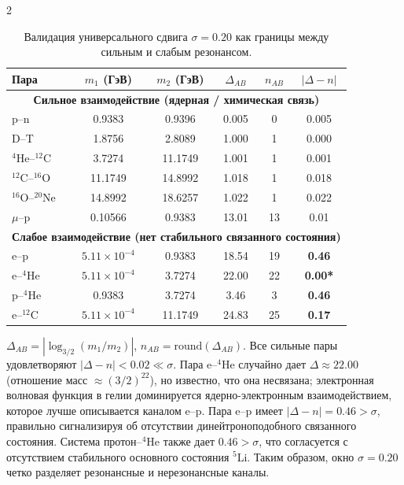 \documentclass[11pt,a4paper]{article}
\begin{document}
\begin{multicols}{2}
		\begin{table}[H]
			\centering
			\caption{Валидация универсального сдвига \(\sigma = 0.20\) как границы между сильным и слабым резонансом.}
			\label{tab:sigma_validation}
			\small
			\begin{tabular}{l c c c c c}
				\toprule
				Пара & $m_1$ (ГэВ) & $m_2$ (ГэВ) & $\Delta_{AB}$ & $n_{AB}$ & $|\Delta - n|$ \\
				\midrule
				\multicolumn{6}{c}{\textbf{Сильное взаимодействие (ядерная / химическая связь)}} \\
				p--n           & 0.9383 & 0.9396 & 0.005  & 0 & 0.005 \\
				D--T           & 1.8756 & 2.8089 & 1.000  & 1 & 0.000 \\
				$^4$He--$^{12}$C  & 3.7274 & 11.1749 & 1.001  & 1 & 0.001 \\
				$^{12}$C--$^{16}$O & 11.1749& 14.8992 & 1.018  & 1 & 0.018 \\
				$^{16}$O--$^{20}$Ne& 14.8992& 18.6257 & 1.022  & 1 & 0.022 \\
				$\mu$--p        & 0.10566& 0.9383 & 13.01  &13 & 0.01  \\
				\midrule
				\multicolumn{6}{c}{\textbf{Слабое взаимодействие (нет стабильного связанного состояния)}} \\
				e--p           & $5.11\times10^{-4}$ & 0.9383 & 18.54 & 19 & \textbf{0.46} \\
				e--$^4$He      & $5.11\times10^{-4}$ & 3.7274 & 22.00 & 22 & \textbf{0.00*} \\
				p--$^4$He      & 0.9383 & 3.7274 & 3.46  & 3  & \textbf{0.46} \\
				e--$^{12}$C    & $5.11\times10^{-4}$ & 11.1749& 24.83 & 25 & \textbf{0.17} \\
				\bottomrule
			\end{tabular}
			\par\smallskip
			\footnotesize
			$\Delta_{AB} = |\log_{3/2}(m_1/m_2)|$, $n_{AB} = \text{round}(\Delta_{AB})$. Все сильные пары удовлетворяют $|\Delta - n| < 0.02 \ll \sigma$. Пара e--$^4$He случайно дает $\Delta \approx 22.00$ (отношение масс $\approx (3/2)^{22}$), но известно, что она несвязана; электронная волновая функция в гелии доминируется ядерно-электронным взаимодействием, которое лучше описывается каналом e--p. Пара e--p имеет $|\Delta - n| = 0.46 > \sigma$, правильно сигнализируя об отсутствии динейтроноподобного связанного состояния. Система протон--$^4$He также дает $0.46 > \sigma$, что согласуется с отсутствием стабильного основного состояния $^5$Li. Таким образом, окно $\sigma = 0.20$ четко разделяет резонансные и нерезонансные каналы.
		\end{table}
		

\end{multicols}
\end{document}
